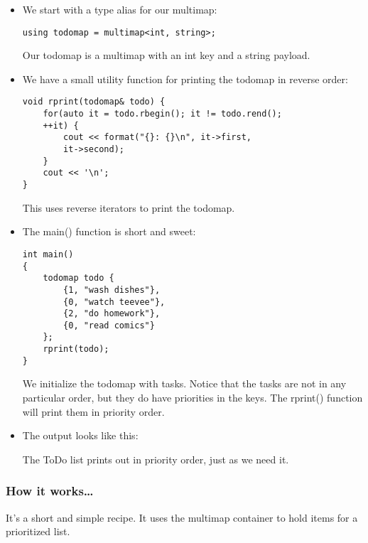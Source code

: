 \begin{itemize}
\item 
We start with a type alias for our multimap:

\begin{lstlisting}[style=styleCXX]
using todomap = multimap<int, string>;
\end{lstlisting}

Our todomap is a multimap with an int key and a string payload.

\item 
We have a small utility function for printing the todomap in reverse order:

\begin{lstlisting}[style=styleCXX]
void rprint(todomap& todo) {
	for(auto it = todo.rbegin(); it != todo.rend();
	++it) {
		cout << format("{}: {}\n", it->first,
		it->second);
	}
	cout << '\n';
}
\end{lstlisting}

This uses reverse iterators to print the todomap.

\item 
The main() function is short and sweet:

\begin{lstlisting}[style=styleCXX]
int main()
{
	todomap todo {
		{1, "wash dishes"},
		{0, "watch teevee"},
		{2, "do homework"},
		{0, "read comics"}
	};
	rprint(todo);
}
\end{lstlisting}

We initialize the todomap with tasks. Notice that the tasks are not in any particular order, but they do have priorities in the keys. The rprint() function will print them in priority order.

\item 
The output looks like this:


The ToDo list prints out in priority order, just as we need it.

\end{itemize}


\subsubsection{How it works…}

It's a short and simple recipe. It uses the multimap container to hold items for a prioritized list.


